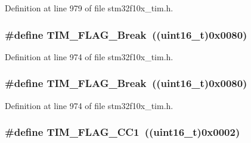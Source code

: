 Definition at line 979 of file stm32f10x\+\_\+tim.\+h.

\subsubsection[{\texorpdfstring{T\+I\+M\+\_\+\+F\+L\+A\+G\+\_\+\+Break}{TIM_FLAG_Break}}]{\setlength{\rightskip}{0pt plus 5cm}\#define T\+I\+M\+\_\+\+F\+L\+A\+G\+\_\+\+Break~(({\bf uint16\+\_\+t})0x0080)}\hypertarget{group___t_i_m___flags_ga166571a1d5ca2bfca5d923eaa22f6deb}{}\label{group___t_i_m___flags_ga166571a1d5ca2bfca5d923eaa22f6deb}


Definition at line 974 of file stm32f10x\+\_\+tim.\+h.

\subsubsection[{\texorpdfstring{T\+I\+M\+\_\+\+F\+L\+A\+G\+\_\+\+Break}{TIM_FLAG_Break}}]{\setlength{\rightskip}{0pt plus 5cm}\#define T\+I\+M\+\_\+\+F\+L\+A\+G\+\_\+\+Break~(({\bf uint16\+\_\+t})0x0080)}\hypertarget{group___t_i_m___flags_ga166571a1d5ca2bfca5d923eaa22f6deb}{}\label{group___t_i_m___flags_ga166571a1d5ca2bfca5d923eaa22f6deb}


Definition at line 974 of file stm32f10x\+\_\+tim.\+h.

\subsubsection[{\texorpdfstring{T\+I\+M\+\_\+\+F\+L\+A\+G\+\_\+\+C\+C1}{TIM_FLAG_CC1}}]{\setlength{\rightskip}{0pt plus 5cm}\#define T\+I\+M\+\_\+\+F\+L\+A\+G\+\_\+\+C\+C1~(({\bf uint16\+\_\+t})0x0002)}\hypertarget{group___t_i_m___flags_gaa7eb8be054b9bd217a9abb1c8687cc55}{}\label{group___t_i_m___flags_gaa7eb8be054b9bd217a9abb1c8687cc55}


